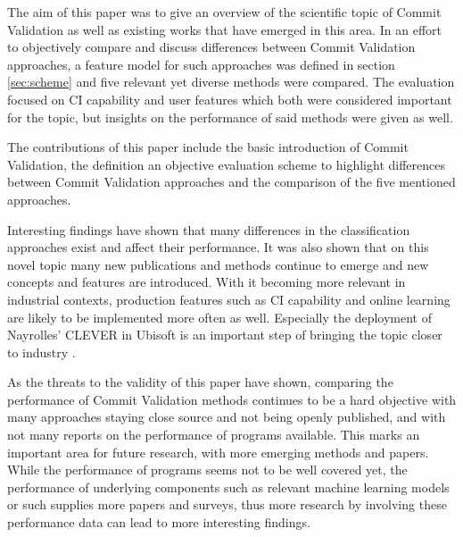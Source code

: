 

The aim of this paper was to give an overview of the scientific topic of Commit Validation as well as existing works that have emerged in this area. In an effort to objectively compare and discuss differences between Commit Validation approaches, a feature model for such approaches was defined in section \ref{sec:scheme} and five relevant yet diverse methods were compared. The evaluation focused on CI capability and user features which both were considered important for the topic, but insights on the performance of said methods were given as well.

The contributions of this paper include the basic introduction of Commit Validation, the definition an objective evaluation scheme to highlight differences between Commit Validation approaches and the comparison of the five mentioned approaches.

Interesting findings have shown that many differences in the classification approaches exist and affect their performance. It was also shown that on this novel topic many new publications and methods continue to emerge and new concepts and features are introduced. With it becoming more relevant in industrial contexts, production features such as CI capability and online learning are likely to be implemented more often as well. Especially the deployment of Nayrolles' CLEVER in Ubisoft is an important step of bringing the topic closer to industry \cite{Nayrolles2018}.

As the threats to the validity of this paper have shown, comparing the performance of Commit Validation methods continues to be a hard objective with many approaches staying close source and not being openly published, and with not many reports on the performance of programs available. This marks an important area for future research, with more emerging methods and papers. While the performance of programs seems not to be well covered yet, the performance of underlying components such as relevant machine learning models or such supplies more papers and surveys, thus more research by involving these performance data can lead to more interesting findings.
